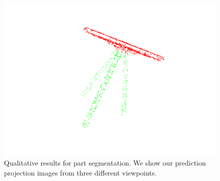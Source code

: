 \begin{figure}[htbp]
\begin{minipage}{0.25\textwidth}
        \centering
        \includegraphics[width=\textwidth]{fig/supplement/part_segmentation/table/table02.pdf}
    \end{minipage}
    \hfill
    \caption{Qualitative results for part segmentation. We show our prediction projection images from three different viewpoints.}
    \label{fig:part_segmentation}
\end{figure}

